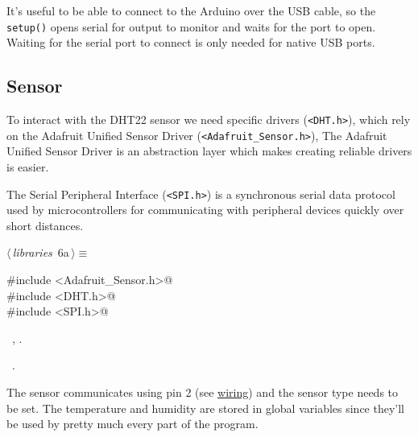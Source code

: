 \documentclass[a4paper, 11pt]{article}
\begin{document}
It's useful to be able to connect to the Arduino over the USB cable,
so the \verb|setup()| opens serial for output to monitor and waits for the port to open.
Waiting for the serial port to connect is only needed for native USB ports.

\subsection{Sensor}

To interact with the DHT22 sensor we need specific drivers (\verb|<DHT.h>|),
which rely on the Adafruit Unified Sensor Driver (\verb|<Adafruit_Sensor.h>|),
The Adafruit Unified Sensor Driver is an abstraction layer
which makes creating reliable drivers is easier. 

The Serial Peripheral Interface (\verb|<SPI.h>|) is a synchronous serial data protocol
used by microcontrollers for communicating with peripheral devices quickly over short distances.

\begin{flushleft} \small
\begin{minipage}{\linewidth}\label{scrap2}\raggedright\small
{}$\langle\,${\itshape libraries}\nobreak\ {\footnotesize{6a}}$\,\rangle\equiv$
\vspace{-1ex}
\begin{list}{}{\setlength{\leftmargin}{1em}} \item
\mbox{}\lstinline@#include <Adafruit_Sensor.h>@\\
\mbox{}\lstinline@#include <DHT.h>@\\
\mbox{}\lstinline@#include <SPI.h>@\\
\mbox{}{\NWsep}
\end{list}
\vspace{-1ex}
\vspace{-1ex}
\footnotesize
\begin{list}{}{\setlength{\itemsep}{-\parsep}\setlength{\itemindent}{-\leftmargin}}
\item \NWtxtMacroDefBy\ , .
\item \NWtxtMacroRefIn\ .
\end{list}
\end{minipage}
\end{flushleft}

The sensor communicates using pin 2 (see \hyperref[sec:wiring]{wiring})
and
the sensor type needs to be set.
The temperature and humidity
are stored in global variables
since they'll be used by pretty much every part of the program.
\end{document}
